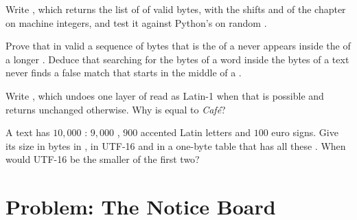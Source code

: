 \begin{exercise}[$\star\star\star$]\label{exo:g10:text-encodings:12}
Write , which returns the list of  of valid  bytes, with the shifts and 
of the chapter on machine integers, and test it against Python's  on random .
\end{exercise}

\begin{exercise}[$\star\star\star$]\label{exo:g10:text-encodings:13}
Prove that in valid  a sequence of bytes that is the  of a  never appears inside the 
of a longer . Deduce that searching for the bytes of a word inside the bytes of a text never finds a false
match that starts in the middle of a .
\end{exercise}

\begin{exercise}[$\star\star\star$]\label{exo:g10:text-encodings:14}
Write , which undoes one layer of  read as Latin-1 when that is possible and returns
 unchanged otherwise. Why is  equal to \textit{Café}?
\end{exercise}

\begin{exercise}[$\star\star\star$]\label{exo:g10:text-encodings:15}
A text has $10{,}000$ : $9{,}000$  , $900$ accented Latin letters and $100$ euro signs. Give
its size in bytes in , in UTF-16 and in a one-byte table that has all these . When would UTF-16 be the
smaller of the first two?
\end{exercise}

\section{Problem: The Notice Board}\label{sec:g10:text-encodings:problem}

